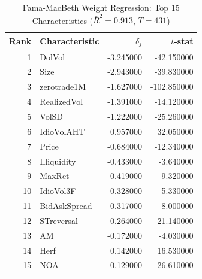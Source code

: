 \begin{table}
\caption{Fama-MacBeth Weight Regression: Top 15 Characteristics ($\bar{R}^2 = 0.913$, $T = 431$)}
\label{tab:weight_regression}
\begin{tabular}{rlrr}
\toprule
Rank & Characteristic & $\bar{\delta}_j$ & $t$-stat \\
\midrule
1 & DolVol & -3.245000 & -42.150000 \\
2 & Size & -2.943000 & -39.830000 \\
3 & zerotrade1M & -1.627000 & -102.850000 \\
4 & RealizedVol & -1.391000 & -14.120000 \\
5 & VolSD & -1.222000 & -25.260000 \\
6 & IdioVolAHT & 0.957000 & 32.050000 \\
7 & Price & -0.684000 & -12.340000 \\
8 & Illiquidity & -0.433000 & -3.640000 \\
9 & MaxRet & 0.419000 & 9.320000 \\
10 & IdioVol3F & -0.328000 & -5.330000 \\
11 & BidAskSpread & -0.317000 & -8.000000 \\
12 & STreversal & -0.264000 & -21.140000 \\
13 & AM & -0.172000 & -4.030000 \\
14 & Herf & 0.142000 & 16.530000 \\
15 & NOA & 0.129000 & 26.610000 \\
\bottomrule
\end{tabular}
\end{table}
